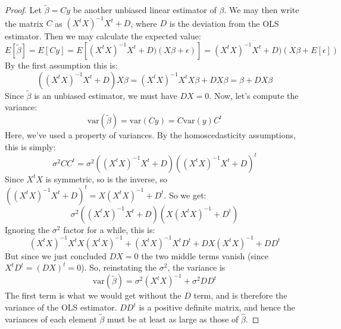 \documentclass[12pt, a4paper]{article}
\begin{document}
\begin{proof}
Let $\tilde{\beta}=Cy$ be another unbiased linear estimator of $\beta$. We may  then write the matrix $C$ as $(X^t X)^{-1}X^t+D$, where $D$ is the deviation from the OLS estimator. Then we may calculate the expected value:
\begin{equation}
E[\tilde{\beta}]=E[Cy]=E[(X^t X)^{-1}X^t+D)(X\beta+\epsilon)]=(X^t X)^{-1}X^t+D)(X\beta+E[\epsilon])
\end{equation}
By the first assumption this is:
\begin{equation}
((X^t X)^{-1}X^t+D)X\beta=(X^t X)^{-1}X^t X\beta+DX\beta=\beta+DX\beta
\end{equation}
Since $\tilde{\beta}$ is an unbiased estimator, we must have $DX=0$. Now, let's compute the variance:
\begin{equation}
\textrm{var}(\tilde{\beta})=\textrm{var}(Cy)=C\textrm{var}(y)C^t
\end{equation}
Here, we've used a property of variances. By the homoscedasticity assumptions, this is simply:
\begin{equation}
\sigma^2 CC^t=\sigma^2((X^t X)^{-1}X^t+D)((X^t X)^{-1}X^t+D)^t
\end{equation}
Since $X^t X$ is symmetric, so is the inverse, so $((X^t X)^{-1}X^t+D)^t=X(X^t X)^{-1}+D^t$. So we get:
\begin{equation}
\sigma^2((X^t X)^{-1}X^t+D)(X(X^t X)^{-1}+D^t)
\end{equation}
Ignoring the $\sigma^2$ factor for a while, this is:
\begin{equation}
(X^t X)^{-1}X^tX(X^t X)^{-1}+(X^t X)^{-1}X^tD^t+DX(X^t X)^{-1}+DD^t
\end{equation}
But since we just concluded $DX=0$ the two middle terms vanish (since $X^tD^t=(DX)^t=0$). So, reinstating the $\sigma^2$, the variance is
\begin{equation}
\textrm{var}(\tilde{\beta})=\sigma^2(X^t X)^{-1}+\sigma^2 DD^t
\end{equation}
The first term is what we would get without the $D$ term, and is therefore the variance of the OLS estimator. $DD^t$ is a positive definite matrix, and hence the variances of each element $\tilde{\beta}$ must be at least as large as those of $\hat{\beta}$.
\end{proof}
\end{document}

